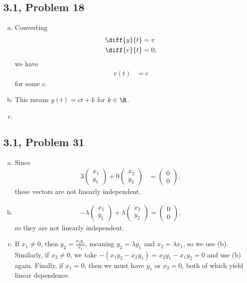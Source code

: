 \documentclass[10pt]{mypackage}
\begin{document}
\subsection{3.1, Problem 18}%
\begin{enumerate}[(a)]
  \item Converting 
    \begin{align*}
      \diff{y}{t} &= v\\
      \diff{v}{t} &= 0,
    \end{align*}
    we have
    \begin{align*}
      v(t) &= c
    \end{align*}
    for some $c$.
  \item This means $y(t) = ct + k$ for $k\in \R$.
  \item 
\end{enumerate}
\subsection{3.1, Problem 31}%
\begin{enumerate}[(a)]
  \item Since
    \begin{align*}
      3 \begin{pmatrix}x_1\\y_1\end{pmatrix} + 0 \begin{pmatrix}x_2\\y_2\end{pmatrix} &= \begin{pmatrix}0\\0\end{pmatrix},
    \end{align*}
    these vectors are not linearly independent.
  \item 
    \begin{align*}
      - \lambda \begin{pmatrix}x_1\\y_1\end{pmatrix} + \lambda \begin{pmatrix}x_2\\y_2\end{pmatrix} = \begin{pmatrix}0\\0\end{pmatrix},
    \end{align*}
    so they are not linearly independent.
  \item If $x_1 \neq 0$, then $y_2 = \frac{x_2y_1}{x_1}$, meaning $y_2 = \lambda y_1$ and $x_2 = \lambda x_1$, so we use (b). Similarly, if $x_2\neq 0$, we take $-\left(x_1y_2 - x_2y_1\right) = x_2y_1 - x_1y_2 = 0$ and use (b) again. Finally, if $x_1 = 0$, then we must have $y_1$ or $x_2 = 0$, both of which yield linear dependence.
\end{enumerate}
\end{document}
